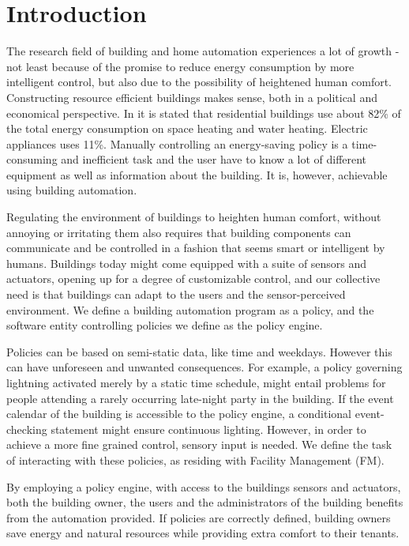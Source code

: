 \section{Introduction} \label{sec:introduction}
The research field of building and home automation experiences a lot of growth - not least because of the promise to reduce energy consumption by more intelligent control, but also due to the possibility of heightened human comfort. Constructing resource efficient buildings makes sense, both in a political and economical perspective. In \cite{janssen2004towards} it is stated that residential buildings use about 82\% of the total energy consumption on space heating and water heating. Electric appliances uses 11\%. Manually controlling an energy-saving policy is
a time-consuming and inefficient task and the user have to know a lot of different equipment as well as information about the building. It is, however, achievable using building automation. 

Regulating the environment of buildings to heighten human comfort, without annoying or irritating them \cite{futurehome} also requires that building components can communicate and be controlled in a fashion that seems smart or intelligent by humans. Buildings today might come equipped with a suite of sensors and actuators, opening up for a degree of customizable control, and our collective need is that buildings can adapt to the users and the sensor-perceived environment. We define a building automation program as a policy, and the software entity controlling policies we define as the policy engine.

Policies can be based on semi-static data, like time and weekdays. However this can have unforeseen and unwanted consequences. For example, a policy governing lightning activated merely by a static time schedule, might entail problems for people attending a rarely occurring late-night party in the building. If the event calendar of the building is accessible to the policy engine, a conditional event-checking statement might ensure continuous lighting. However, in order to achieve a more fine grained control, sensory input is needed. We define the task of interacting with these policies, as residing with Facility Management (FM). 

By employing a policy engine, with access to the buildings sensors and actuators, both the building owner, the users and the administrators of the building benefits from the automation provided. If policies are correctly defined, building owners save energy and natural resources while providing extra comfort to their tenants. 

